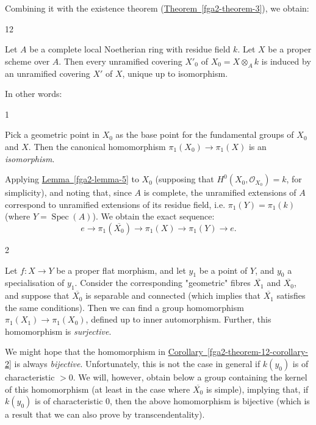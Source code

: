   Combining it with the existence theorem (\hyperref[fga2-theorem-3]{Theorem~\ref*{fga2-theorem-3}}), we obtain:\begin{lemma}{12}\label{fga2-theorem-12}\skipsinglepar\par{}Let \(A\) be a complete local Noetherian ring with residue field \(k\).
    Let \(X\) be a proper scheme over \(A\).
    Then every unramified covering \(X'_0\) of \(X_0=X\otimes _Ak\) is induced by an unramified covering \(X'\) of \(X\), unique up to isomorphism.\end{lemma}\par{}In other words:\begin{corollary}{1}\label{fga2-theorem-12-corollary-1}\skipsinglepar\par{}Pick a geometric point in \(X_0\) as the base point for the fundamental groups of \(X_0\) and \(X\).
    Then the canonical homomorphism \(\pi _1(X_0)\to \pi _1(X)\) is an \emph{isomorphism}.\end{corollary}\par{}Applying \hyperref[fga2-lemma-5]{Lemma~\ref*{fga2-lemma-5}} to \(X_0\) (supposing that \(H^0(X_0,\mathcal {O}_{X_0})=k\), for simplicity), and noting that, since \(A\) is complete, the unramified extensions of \(A\) correspond to unramified extensions of its residue field, i.e. \(\pi _1(Y)=\pi _1(k)\) (where \(Y=\operatorname {Spec}(A)\)).
  We obtain the exact sequence:
  \[     e \to  \pi _1(\overline {X_0}) \to  \pi _1(X) \to  \pi _1(Y) \to  e.   \]\begin{corollary}{2}\label{fga2-theorem-12-corollary-2}\skipsinglepar\par{}Let \(f\colon  X\to  Y\) be a proper flat morphism, and let \(y_1\) be a point of \(Y\), and \(y_0\) a specialisation of \(y_1\).
    Consider the corresponding "geometric" fibres \(\overline {X_1}\) and \(\overline {X_0}\), and suppose that \(\overline {X_0}\) is separable and connected (which implies that \(\overline {X_1}\) satisfies the same conditions).
    Then we can find a group homomorphism \(\pi _1(X_1)\to \pi _1(X_0)\), defined up to inner automorphism.
    Further, this homomorphism is \emph{surjective}.\end{corollary}\par{}We might hope that the homomorphism in \hyperref[fga2-theorem-12-corollary-2]{Corollary~\ref*{fga2-theorem-12-corollary-2}} is always \emph{bijective}.
  Unfortunately, this is not the case in general if \(k(y_0)\) is of characteristic \(>0\).
  We will, however, obtain below a group containing the kernel of this homomorphism (at least in the case where \(\overline {X_0}\) is simple), implying that, if \(k(y_0)\) is of characteristic \(0\), then the above homomorphism is bijective (which is a result that we can also prove by transcendentality).

